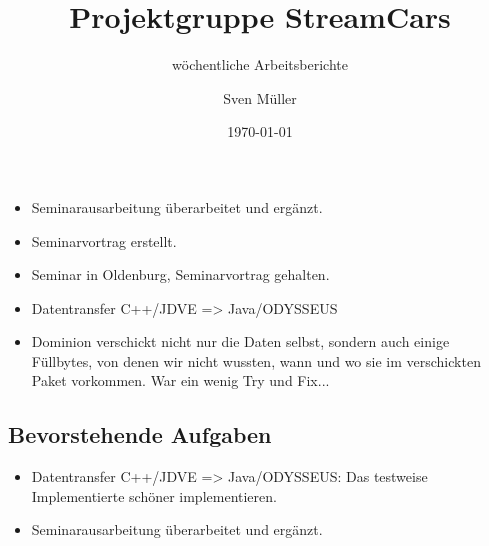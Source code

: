 \documentclass{scrartcl}  %
\title{Projektgruppe StreamCars} %
\subtitle{wöchentliche Arbeitsberichte}
\author{Sven Müller} %
\date{\today}
\renewenvironment{workToDo}{\subsection{Bevorstehende Aufgaben}}{}
\begin{document}
	\maketitle
	
	\newpage
	
	\tableofcontents
	
\week

\begin{workDone}
	\begin{itemize}
		\item Seminarausarbeitung überarbeitet und ergänzt.
		\item Seminarvortrag erstellt.
		\item Seminar in Oldenburg, Seminarvortrag gehalten.
		\item Datentransfer C++/JDVE => Java/ODYSSEUS 
	\end{itemize}
\end{workDone}

\begin{workProblems}
	\begin{itemize}
		\item Dominion verschickt nicht nur die Daten selbst, sondern auch einige Füllbytes, von denen wir nicht wussten, wann und wo sie im verschickten Paket vorkommen. War ein wenig Try und Fix...
	\end{itemize}
\end{workProblems}

\begin{workToDo}
	\begin{itemize}
		\item Datentransfer C++/JDVE => Java/ODYSSEUS: Das testweise Implementierte schöner implementieren.
	\end{itemize}
\end{workToDo}

\week

\begin{workDone}
	\begin{itemize}
		\item Seminarausarbeitung überarbeitet und ergänzt.
	\end{itemize}
\end{workDone}
\end{document}
